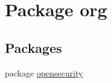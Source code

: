 \hypertarget{a00031}{\section{Package org}
\label{a00031}
}
\subsection*{Packages}
\begin{DoxyCompactItemize}
\item 
package \hyperlink{a00032}{opensecurity}
\end{DoxyCompactItemize}
